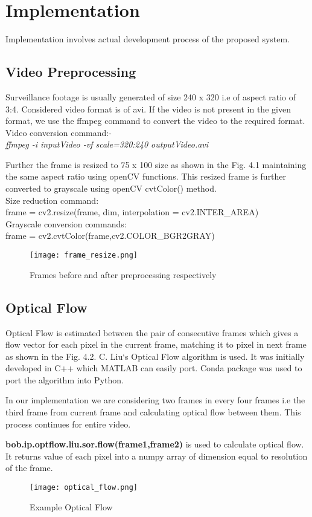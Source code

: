 \chapter{Implementation}
Implementation involves actual development process of the proposed system.
\section{Video Preprocessing}
Surveillance footage is usually generated of size 240 x 320 i.e of aspect ratio of 3:4. Considered video format is of avi. If the video is not present in the given format, we use the ffmpeg command to convert the video to the required format. 
\\
Video conversion command:-\\
\textit{ffmpeg -i {inputVideo} -vf scale=320:240 outputVideo.avi}
\par
Further the frame is resized to 75 x 100 size as shown in the Fig. 4.1 maintaining the same aspect ratio using openCV functions. This resized frame is further converted to grayscale using openCV\cite{opencv} cvtColor() method. \\
Size reduction command:\\
frame = cv2.resize(frame, dim, interpolation = cv2.INTER\_AREA)\\
Grayscale conversion commands: \\
frame = cv2.cvtColor(frame,cv2.COLOR\_BGR2GRAY)
\begin{center}
\begin{figure}[H]
\centering
\texttt{[image: frame\_resize.png]}
\caption{Frames before and after preprocessing respectively}
\end{figure}
\end{center}
\section{Optical Flow}
Optical Flow is estimated between the pair of consecutive frames which gives a flow vector for each pixel in the current frame, matching it to pixel in next frame as shown in the Fig. 4.2. C. Liu`s Optical Flow algorithm\cite{liu} is used. It was initially developed in C++ which MATLAB can easily port. Conda package was used to port the algorithm into Python. \par
	In our implementation we are considering two frames in every four frames i.e the third frame from current frame and calculating optical flow between them. This process continues for entire video. \par \textbf{bob.ip.optflow.liu.sor.flow(frame1,frame2)} is used to calculate optical flow. It returns value of each pixel into a numpy array of dimension equal to resolution of the frame.
\begin{center}
\begin{figure}[H]
\centering
\texttt{[image: optical\_flow.png]}
\caption{Example Optical Flow}
\end{figure}
\end{center}

